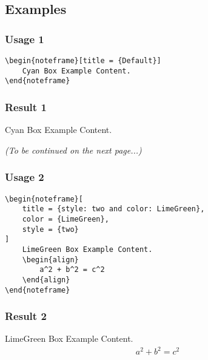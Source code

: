 \documentclass{article}
\begin{document}
\subsection{Examples}
\subsubsection{Usage 1}
\begin{flushleft}
\begin{verbatim}
\begin{noteframe}[title = {Default}]
    Cyan Box Example Content.
\end{noteframe}
\end{verbatim}
\end{flushleft}

\subsubsection{Result 1}
\begin{noteframe}[title = {Default}]
    Cyan Box Example Content.
\end{noteframe}

\begin{flushright}
{\sl (To be continued on the next page...)}
\end{flushright}

\newpage

\subsubsection{Usage 2}
\begin{flushleft}
\begin{verbatim}
\begin{noteframe}[
    title = {style: two and color: LimeGreen},
    color = {LimeGreen},
    style = {two}
]
    LimeGreen Box Example Content.
    \begin{align}
        a^2 + b^2 = c^2
    \end{align}
\end{noteframe}
\end{verbatim}
\end{flushleft}

\subsubsection{Result 2}
\begin{noteframe}[
    title = {style: two and color: LimeGreen},
    color = {LimeGreen},
    style = {two}
]
    LimeGreen Box Example Content.
    \begin{align}
        a^2 + b^2 = c^2
    \end{align}
\end{noteframe}
\end{document}
